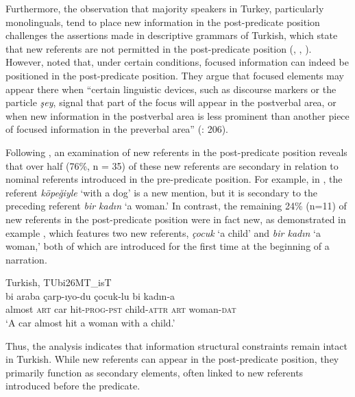 Furthermore, the observation that majority speakers in Turkey, particularly monolinguals, tend to place new information in the post-predicate position challenges the assertions made in descriptive grammars of Turkish, which state that new referents are not permitted in the post-predicate position (\citealt{Erguvanli1984}, \citealt{GokselÖzsoy2000}, \citealt{Issever2003}). However, \citet{DogruozBackus2007} noted that, under certain conditions, focused information can indeed be positioned in the post-predicate position. They argue that focused elements may appear there when “certain linguistic devices, such as discourse markers or the particle \textit{şey}, signal that part of the focus will appear in the postverbal area, or when new information in the postverbal area is less prominent than another piece of focused information in the preverbal area” (\citealt{DogruozBackus2007}: 206).

Following \citet{DogruozBackus2007}, an examination of new referents in the post-predicate position reveals that over half (76\%, n = 35) of these new referents are secondary in relation to nominal referents introduced in the pre-predicate position. For example, in , the referent \textit{köpeğiyle} ‘with a dog’ is a new mention, but it is secondary to the preceding referent \textit{bir kadın} ‘a woman.’ In contrast, the remaining 24\% (n=11) of new referents in the post-predicate position were in fact new, as demonstrated in example , which features two new referents, \textit{çocuk} ‘a child’ and \textit{bir kadın} ‘a woman,’ both of which are introduced for the first time at the beginning of a narration.

\ea%
  \label{ex:key:54} Turkish, TUbi26MT\_isT \\
  bi  araba  çarp-ıyo-du  çocuk-lu  bi  kadın-a \\
almost \textsc{art}  car  hit-\textsc{prog-pst}  child\textsc{-attr} \textsc{art}  woman\textsc{-dat}\\
\glt ‘A car almost hit a woman with a child.’ \\
  \z

Thus, the analysis indicates that information structural constraints remain intact in Turkish. While new referents can appear in the post-predicate position, they primarily function as secondary elements, often linked to new referents introduced before the predicate.

